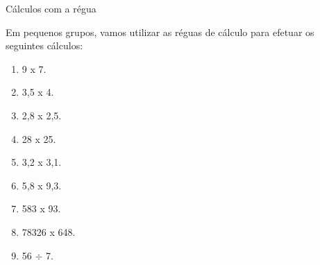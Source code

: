 \begin{task}{Cálculos com a régua}

Em pequenos grupos, vamos utilizar as réguas de cálculo para efetuar os seguintes cálculos:
\begin{enumerate}
 \item 9 x 7. %
 \item 3,5 x 4.%
 \item 2,8 x 2,5.%
 \item 28 x 25.%
 \item 3,2 x 3,1.%
\item 5,8 x 9,3.%
\item 583 x 93.%
\item 78326 x 648.%
\item 56 $\div$ 7.%

\end{enumerate}
\end{task}
